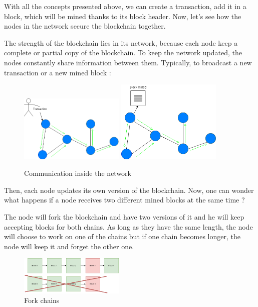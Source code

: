   With all the concepts presented above, we can create a transaction, add it in a block, which will be mined thanks to its block header. Now, let's see how the nodes in the network secure the blockchain together. \newline

  The strength of the blockchain lies in its network, because each node keep a complete or partial copy of the blockchain. To keep the network updated, the nodes constantly share information between them. Typically, to broadcast a new transaction or a new mined block :

  \clearpage

  \begin{figure}[h]
  \centering
  \includegraphics[width=5cm]{Figures/networkTransaction}
  \hspace{1cm}
  \includegraphics[width=5cm]{Figures/networkBlock}
  \caption{Communication inside the network}
  \end{figure}

  Then, each node updates its own version of the blockchain. Now, one can wonder what happens if a node receives two different mined blocks at the same time ?

  The node will fork the blockchain and have two versions of it and he will keep accepting blocks for both chains. As long as they have the same length, the node will choose to work on one of the chains but if one chain becomes longer, the node will keep it and forget the other one.

  \begin{figure}[h]
  \centering
  \includegraphics[width=5cm]{Figures/forkChains}
  \caption{Fork chains}
  \end{figure}


